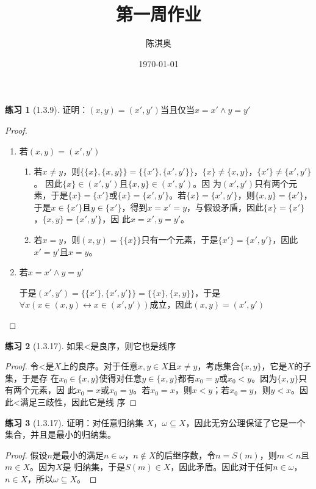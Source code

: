 \documentclass[11pt]{article}
\author{陈淇奥}
\date{\today}
\title{第一周作业}
\theoremstyle{definition}
\newtheorem{exercise}{练习}
\begin{document}
\maketitle
\begin{exercise}[1.3.9]
证明：\((x,y)=(x',y')\)当且仅当\(x=x'\wedge y=y'\)
\end{exercise}

\begin{proof}
\begin{enumerate}
\item 若\((x,y)=(x',y')\)
\begin{enumerate}
\item 若\(x\neq y\)，则\(\{\{x\},\{x,y\}\}=\{\{x'\},\{x',y'\}\}\)，\(\{x\}\neq\{x,y\}\)，\(\{x'\}\neq\{x',y'\}\)。
因此\(\{x\}\in(x',y')\)且\(\{x,y\}\in(x',y')\)。因
为\((x',y')\)只有两个元素，于是\(\{x\}=\{x'\}\)或\(\{x\}=\{x',y'\}\)。若\(\{x\}=\{x',y'\}\)，则\(\{x,y\}=\{x'\}\)，
于是\(x\in\{x'\}\)且\(y\in\{x'\}\)，得到\(x=x'=y\)，与假设矛盾，因此\(\{x\} =\{x'\}\)，\(\{x,y\} =\{x',y'\}\)，因
此\(x=x',y=y'\)。
\item 若\(x=y\)，则\((x,y) =\{\{x\}\}\)只有一个元素，于是\(\{x'\} =\{x',y'\}\)，因此\(x'=y'\)且\(x=y\)。
\end{enumerate}
\item 若\(x=x'\wedge y=y'\)

于是\((x',y')=\{\{x'\},\{x',y'\}\}=\{\{x\},\{x,y\}\}\)，于是\(\forall x(x\in(x,y)\leftrightarrow x\in(x',y'))\)成立，因此\((x,y)=(x',y')\)
\end{enumerate}
\end{proof}

\begin{exercise}[1.3.17]
如果<是良序，则它也是线序
\end{exercise}

\begin{proof}
令<是\(X\)上的良序。对于任意\(x,y\in X\)且\(x\neq y\)，考虑集合\(\{x,y\}\)，它是\(X\)的子集，于是存
在\(x_0\in\{x,y\}\)使得对任意\(y\in\{x,y\}\)都有\(x_0=y\)或\(x_0<y\)。因为\(\{x,y\}\)只有两个元素，因
此\(x_0=x\)或\(x_0=y\)。若\(x_0=x\)，则\(x<y\)；若\(x_0=y\)，则\(y<x\)。因此<满足三歧性，因此它是线
序
\end{proof}

\begin{exercise}[1.3.17]
证明：对任意归纳集 \(X\)，\(\omega\subseteq X\)，因此无穷公理保证了它是一个集合，并且是最小的归纳集。
\end{exercise}

\begin{proof}
假设\(n\)是最小的满足\(n\in\omega\)，\(n\not\in X\)的后继序数，令\(n=S(m)\)，则\(m<n\)且\(m\in X\)。因为\(X\)是
归纳集，于是\(S(m)\in X\)，因此矛盾。因此对于任何\(n\in\omega\)，\(n\in X\)，所以\(\omega\subseteq X\)。
\end{proof}
\end{document}
